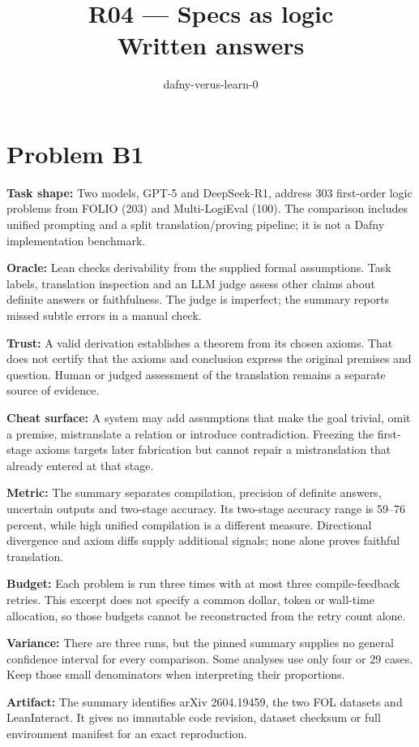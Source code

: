 \documentclass[11pt]{article}
\title{R04 --- Specs as logic \\ \large Written answers}
\author{dafny-verus-learn-0}
\date{}
\begin{document}
\maketitle
\section*{Problem B1}\label{ans:B1}
\begin{answer}
\textbf{Task shape:} Two models, GPT-5 and DeepSeek-R1, address 303 first-order logic problems from FOLIO (203) and Multi-LogiEval (100). The comparison includes unified prompting and a split translation/proving pipeline; it is not a Dafny implementation benchmark.

\textbf{Oracle:} Lean checks derivability from the supplied formal assumptions. Task labels, translation inspection and an LLM judge assess other claims about definite answers or faithfulness. The judge is imperfect; the summary reports missed subtle errors in a manual check.

\textbf{Trust:} A valid derivation establishes a theorem from its chosen axioms. That does not certify that the axioms and conclusion express the original premises and question. Human or judged assessment of the translation remains a separate source of evidence.

\textbf{Cheat surface:} A system may add assumptions that make the goal trivial, omit a premise, mistranslate a relation or introduce contradiction. Freezing the first-stage axioms targets later fabrication but cannot repair a mistranslation that already entered at that stage.

\textbf{Metric:} The summary separates compilation, precision of definite answers, uncertain outputs and two-stage accuracy. Its two-stage accuracy range is 59--76 percent, while high unified compilation is a different measure. Directional divergence and axiom diffs supply additional signals; none alone proves faithful translation.

\textbf{Budget:} Each problem is run three times with at most three compile-feedback retries. This excerpt does not specify a common dollar, token or wall-time allocation, so those budgets cannot be reconstructed from the retry count alone.

\textbf{Variance:} There are three runs, but the pinned summary supplies no general confidence interval for every comparison. Some analyses use only four or 29 cases. Keep those small denominators when interpreting their proportions.

\textbf{Artifact:} The summary identifies arXiv 2604.19459, the two FOL datasets and LeanInteract. It gives no immutable code revision, dataset checksum or full environment manifest for an exact reproduction.
\end{answer}
\end{document}
